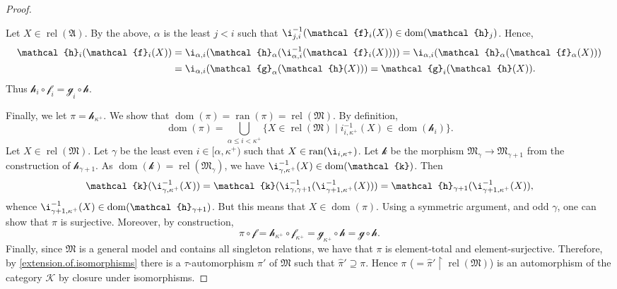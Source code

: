\documentclass[a4paper]{amsart}
\theoremstyle{definition}
\theoremstyle{remark}
\renewcommand{\restriction}{ {\upharpoonright} }
\newcommand{\A}{\mathcal{A}}
\newcommand{\M}{\mathcal{M}}
\DeclareMathOperator{\dom}{dom}
\DeclareMathOperator{\ran}{ran}
\DeclareMathOperator{\rel}{rel}
\newcommand{\K}{\mathcal{K}}
\theoremstyle{definition}
\renewcommand{\A}{\mathfrak{A}}
\renewcommand{\M}{\mathfrak{M}}
\newcommand{\f}{\mathcal{f}}
\newcommand{\g}{\mathcal{g}}
\newcommand{\h}{\mathcal{h}}
\renewcommand{\k}{\mathcal{k}}
\begin{document}
\begin{proof}
\begin{enumerate}
        Let $X\in\rel(\A)$. By the above, $\alpha$ is the least $j<i$ such that $\i_{j,i}^{-1}(\f_i(X))\in\dom(\h_j)$. Hence,
        \begin{align*}
            \h_i(\f_i(X)) &= \i_{\alpha,i}(\h_\alpha(\i_{\alpha,i}^{-1}(\f_i(X)))) = \i_{\alpha,i}(\h_\alpha(\f_\alpha(X))) \\
            &= \i_{\alpha,i}(\g_\alpha(\h(X))) = \g_i(\h(X)).
        \end{align*}
        Thus $\h_i\circ\f_i = \g_i\circ\h$.
    \end{enumerate}

    Finally, we let $\pi = \h_{\kappa^+}$. We show that $\dom(\pi) = \ran(\pi) = \rel(\M)$.
    By definition,
    \[
        \dom(\pi) = \bigcup_{\alpha\leq i<\kappa^+} \{ X\in\rel(\M) \mid i_{i,\kappa^+}^{-1}(X)\in\dom(\h_i) \}.
    \]
    Let $X\in\rel(\M)$. Let $\gamma$ be the least even $i\in[\alpha,\kappa^+)$ such that $X \in\ran(\i_{i,\kappa^+})$. Let $\k$ be the morphism $\M_\gamma\to\M_{\gamma+1}$ from the construction of $\h_{\gamma+1}$. As $\dom(\k) = \rel(\M_\gamma)$, we have $\i_{\gamma,\kappa^+}^{-1}(X)\in\dom(\k)$. Then
    \[
        \k(\i_{\gamma,\kappa^+}^{-1}(X)) = \k(\i_{\gamma,\gamma+1}^{-1}(\i_{\gamma+1,\kappa^+}^{-1}(X))) = \h_{\gamma+1}(\i_{\gamma+1,\kappa^+}^{-1}(X)),
    \]
    whence $\i_{\gamma+1,\kappa^+}^{-1}(X)\in\dom(\h_{\gamma+1})$. But this means that $X\in\dom(\pi)$. Using a symmetric argument, and odd $\gamma$, one can show that $\pi$ is surjective. Moreover, by construction,
    \[
        \pi\circ\f = \h_{\kappa^+}\circ\f_{\kappa^+} = \g_{\kappa^+}\circ\h = \g\circ\h.
    \]
    Finally, since $\M$ is a general model and contains all singleton relations, we have that $\pi$ is element-total and element-surjective. Therefore, by  \cref{extension.of.isomorphisms} there is a $\tau$-automorphism $\pi'$ of $\M$ such that $\hat\pi'\supseteq\pi$. Hence $\pi$ ($=\hat\pi'\restriction\rel(\M)$) is an automorphism of the category $\K$ by closure under isomorphisms.
\end{proof}
\end{document}
